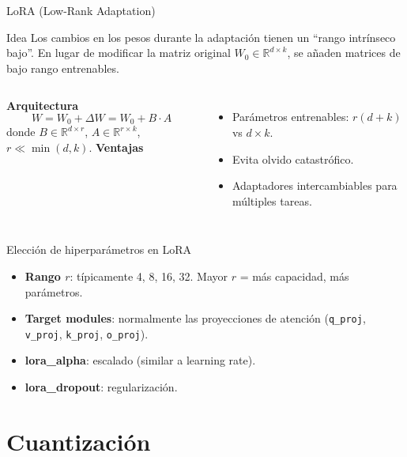 \documentclass[aspectratio=169, 10pt, xcolor=table]{beamer}
\begin{document}
\begin{frame}{LoRA (Low-Rank Adaptation)}
    \begin{block}{Idea}
        Los cambios en los pesos durante la adaptación tienen un ``rango intrínseco bajo''. En lugar de modificar la matriz original $W_0 \in \mathbb{R}^{d \times k}$, se añaden matrices de bajo rango entrenables.
    \end{block}
    \begin{columns}[t]
        \textbf{Arquitectura}
        \[
        W = W_0 + \Delta W = W_0 + B \cdot A
        \]
        donde $B \in \mathbb{R}^{d \times r}$, $A \in \mathbb{R}^{r \times k}$, $r \ll \min(d,k)$.
        \textbf{Ventajas}
        \begin{itemize}
            \item Parámetros entrenables: $r(d+k)$ vs $d \times k$.
            \item Evita olvido catastrófico.
            \item Adaptadores intercambiables para múltiples tareas.
        \end{itemize}
    \end{columns}
\end{frame}

\begin{frame}{Elección de hiperparámetros en LoRA}
    \begin{itemize}
        \item \textbf{Rango $r$}: típicamente 4, 8, 16, 32. Mayor $r$ = más capacidad, más parámetros.
        \item \textbf{Target modules}: normalmente las proyecciones de atención (\texttt{q\_proj}, \texttt{v\_proj}, \texttt{k\_proj}, \texttt{o\_proj}).
        \item \textbf{lora\_alpha}: escalado (similar a learning rate).
        \item \textbf{lora\_dropout}: regularización.
    \end{itemize}
\end{frame}

\section{Cuantización}
\end{document}
